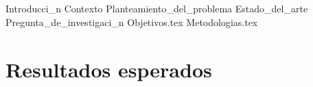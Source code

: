 \documentclass{article}
\begin{document}
  \begin{titlepage}
    \centering
    \vspace*{2cm}
    \titleblock [2cm]
    \vspace{1cm}  %
    \authorblock
    \vfill  %
    \location \\
    \dateblock \\
    \footnotesize { \texttt{\fullversion} }
  \end{titlepage}

  
  \attributionpage

  \tableofcontents
  \newpage

  \clearpage

  {Introducci_n}
  {Contexto}
  {Planteamiento_del_problema}
  {Estado_del_arte}
  {Pregunta_de_investigaci_n}
  {Objetivos.tex}
  {Metodologias.tex}
  
  \section{Resultados esperados}
    \blindtext

  \printbibliography
\end{document}
